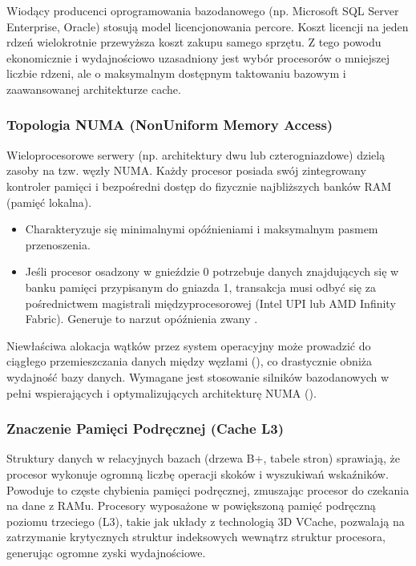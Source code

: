 \documentclass[letterpaper,10pt,polish]{sphinxmanual}
\begin{document}
\sphinxAtStartPar
{} Wiodący producenci oprogramowania bazodanowego (np. Microsoft SQL Server Enterprise, Oracle) stosują model licencjonowania per\sphinxhyphen{}core. Koszt licencji na jeden rdzeń wielokrotnie przewyższa koszt zakupu samego sprzętu. Z tego powodu ekonomicznie i wydajnościowo uzasadniony jest wybór procesorów o mniejszej liczbie rdzeni, ale o maksymalnym dostępnym taktowaniu bazowym i zaawansowanej architekturze cache.


\subsubsection{Topologia NUMA (Non\sphinxhyphen{}Uniform Memory Access)}
\label{\detokenize{rozdzia_u0142_2/rozdzia_u0142_21/index:topologia-numa-non-uniform-memory-access}}
\sphinxAtStartPar
Wieloprocesorowe serwery (np. architektury dwu\sphinxhyphen{} lub czterogniazdowe) dzielą zasoby na tzw. węzły NUMA. Każdy procesor posiada swój zintegrowany kontroler pamięci i bezpośredni dostęp do fizycznie najbliższych banków RAM (pamięć lokalna).
\begin{itemize}
\item {} 
\sphinxAtStartPar
{} Charakteryzuje się minimalnymi opóźnieniami i maksymalnym pasmem przenoszenia.

\item {} 
\sphinxAtStartPar
{} Jeśli procesor osadzony w gnieździe 0 potrzebuje danych znajdujących się w banku pamięci przypisanym do gniazda 1, transakcja musi odbyć się za pośrednictwem magistrali międzyprocesorowej (Intel UPI lub AMD Infinity Fabric). Generuje to narzut opóźnienia zwany .

\end{itemize}

\sphinxAtStartPar
Niewłaściwa alokacja wątków przez system operacyjny może prowadzić do ciągłego przemieszczania danych między węzłami (), co drastycznie obniża wydajność bazy danych. Wymagane jest stosowanie silników bazodanowych w pełni wspierających i optymalizujących architekturę NUMA ().


\subsubsection{Znaczenie Pamięci Podręcznej (Cache L3)}
\label{\detokenize{rozdzia_u0142_2/rozdzia_u0142_21/index:znaczenie-pamieci-podrecznej-cache-l3}}
\sphinxAtStartPar
Struktury danych w relacyjnych bazach (drzewa B+, tabele stron) sprawiają, że procesor wykonuje ogromną liczbę operacji skoków i wyszukiwań wskaźników. Powoduje to częste chybienia pamięci podręcznej, zmuszając procesor do czekania na dane z RAM\sphinxhyphen{}u. Procesory wyposażone w powiększoną pamięć podręczną poziomu trzeciego (L3), takie jak układy z technologią 3D V\sphinxhyphen{}Cache, pozwalają na zatrzymanie krytycznych struktur indeksowych wewnątrz struktur procesora, generując ogromne zyski wydajnościowe.
\end{document}
